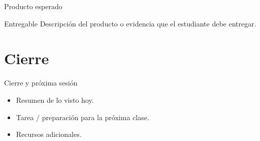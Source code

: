 \documentclass[aspectratio=169,11pt]{beamer}
\begin{document}
\begin{frame}{Producto esperado}
  \begin{exampleblock}{Entregable}
    Descripción del producto o evidencia que el estudiante debe entregar.
  \end{exampleblock}
\end{frame}

\section{Cierre}
\begin{frame}{Cierre y próxima sesión}
  \begin{itemize}
    \item Resumen de lo visto hoy.
    \item Tarea / preparación para la próxima clase.
    \item Recursos adicionales.
  \end{itemize}
\end{frame}

{
\begin{frame}[plain]
\end{frame}
}
\end{document}
